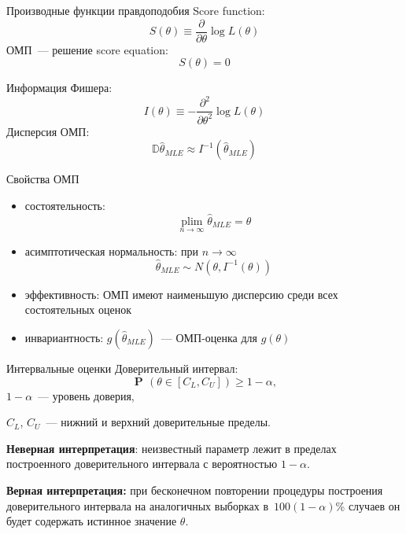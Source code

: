 \documentclass[9pt,pdf,utf8,hyperref={unicode},aspectratio=169]{beamer}
\DeclareMathOperator*{\plim}{\mathop{plim}}
\DeclareMathOperator{\prob}{\mathbf{P}\!}
\begin{document}
\begin{frame}{Производные функции правдоподобия}
	Score function:
	$$S\left(\theta\right) \equiv \frac{\partial}{\partial \theta} \log L\left( \theta\right)$$
	ОМП~--- решение score equation:
	$$S\left(\theta\right)=0$$
	
	\bigskip 
	
	Информация Фишера:
	$$I\left(\theta\right) \equiv  - \frac{\partial^2}{\partial\theta^2}\log L\left(\theta\right)$$
	Дисперсия ОМП:
	$$\mathbb D\hat{\theta}_{MLE} \approx I^{-1}\left(\hat{\theta}_{MLE}\right)$$
\end{frame}

\begin{frame}{Свойства ОМП}
% 
	\begin{itemize}
		\item состоятельность: $$\plim\limits_{n\rightarrow\infty} \hat{\theta}_{MLE}  = \theta$$
		\item асимптотическая нормальность: при $n\rightarrow \infty$ $$\hat{\theta}_{MLE}\sim N\left(\theta, I^{-1}(\theta)\right)$$
		\item эффективность: ОМП имеют наименьшую дисперсию среди всех состоятельных оценок
		\item инвариантность: $g\left(\hat{\theta}_{MLE}\right)$~--- ОМП-оценка для $g\left(\theta\right)$
	\end{itemize}
\end{frame}

\begin{frame}{Интервальные оценки}
% 
    Доверительный интервал:
    $$\prob\left(\theta \in \left[C_L, C_U\right]\right)\geq 1-\alpha,$$
    $1-\alpha$~--- уровень доверия, 
    
    $C_L$, $C_U$~--- нижний и верхний доверительные пределы.

    \bigskip

	\textbf{Неверная интерпретация}: неизвестный параметр лежит в пределах построенного доверительного интервала с вероятностью $1-\alpha$.
	
	\bigskip

	\textbf{Верная интерпретация:} при бесконечном повторении процедуры построения доверительного интервала на аналогичных выборках в~$100(1-\alpha)$\% случаев он будет содержать истинное значение $\theta$.
\end{frame}
\end{document}
